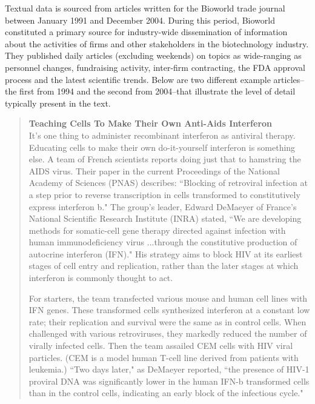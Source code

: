 Textual data is sourced from articles written for the Bioworld trade journal between January 1991 and December 2004. During this period, Bioworld constituted a primary source for industry-wide dissemination of information about the activities of firms and other stakeholders in the biotechnology industry. They published daily articles (excluding weekends) on topics as wide-ranging as personnel changes, fundraising activity, inter-firm contracting, the FDA approval process and the latest scientific trends. Below are two different example articles--the first from 1994 and the second from 2004--that illustrate the level of detail typically present in the text.

\begin{singlespace}
\begin{small}
\begin{quotation}
\noindent \textbf{Teaching Cells To Make Their Own Anti-Aids Interferon} \\

It's one thing to administer recombinant interferon as antiviral therapy. Educating cells to make their own do-it-yourself interferon is something else. A team of French scientists reports doing just that to hamstring the AIDS virus. Their paper in the current Proceedings of the National Academy of Sciences (PNAS) describes: ``Blocking of retroviral infection at a step prior to reverse transcription in cells transformed to constitutively express interferon b." The group's leader, Edward DeMaeyer of France's National Scientific Research Institute (INRA) stated, ``We are developing methods for somatic-cell gene therapy directed against infection with human immunodeficiency virus ...through the constitutive production of autocrine interferon (IFN)." His strategy aims to block HIV at its earliest stages of cell entry and replication, rather than the later stages at which interferon is commonly thought to act.

For starters, the team transfected various mouse and human cell lines with IFN genes. These transformed cells synthesized interferon at a constant low rate; their replication and survival were the same as in control cells. When challenged with various retroviruses, they markedly reduced the number of virally infected cells. Then the team assailed CEM cells with HIV viral particles. (CEM is a model human T-cell line derived from patients with leukemia.) ``Two days later," as DeMaeyer reported, ``the presence of HIV-1 proviral DNA was significantly lower in the human IFN-b transformed cells than in the control cells, indicating an early block of the infectious cycle."


\end{quotation}
\end{small}
\end{singlespace}
